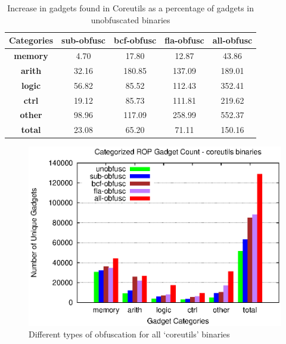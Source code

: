 \begin{table} [htbp]
    \centering
    \begin{adjustbox}{max width=\linewidth}
    \begin{tabular}{|c|c|c|c|c|}
        \hline
        \bf Categories & \bf sub-obfusc & \bf bcf-obfusc & \bf fla-obfusc & \bf all-obfusc \\
        \hline
        \bf memory & 4.70 & 17.80 & 12.87 & 43.86	\\
        \bf arith & 32.16 & 180.85 & 137.09 & 189.01 \\
        \bf logic & 56.82 & 85.52 & 112.43 & 352.41 \\
        \bf ctrl & 19.12 & 85.73 & 111.81 & 219.62 \\ 
        \bf other & 98.96 & 117.09 & 258.99 & 552.37 \\
        \bf total & 23.08 & 65.20 & 71.11 & 150.16 \\
        \hline
    \end{tabular}
    \end{adjustbox}
    \captionsetup{font=footnotesize, labelfont=bf, justification=centering}
    \caption{Increase in gadgets found in Coreutils as a percentage of gadgets in unobfuscated binaries}
    \label{tab:gadget_increase}
\end{table}

\begin{figure}
    \includegraphics[width=\linewidth]{figures/coretutils-aggregate-all.eps}
    \captionsetup{font=footnotesize, labelfont=bf, justification=centering}
    \caption{Different types of obfuscation for all `coreutils' binaries}
    \label{fig:types_of_obfusc}
\end{figure}

